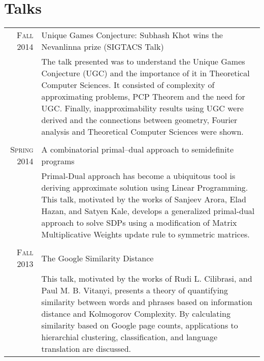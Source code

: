 \documentclass[a4paper,10pt]{article}
\begin{document}
\section{Talks}
\begin{tabular}{r|p{12cm}}
 \textsc{Fall 2014} & Unique Games Conjecture: Subhash Khot wins the Nevanlinna prize (SIGTACS Talk)\\
 &\small{The talk presented was to understand the Unique Games Conjecture (UGC) and the importance of it in Theoretical Computer Sciences. It consisted of complexity of approximating problems, PCP Theorem and the need for UGC. Finally, inapproximability results using UGC were derived and the connections between geometry, Fourier analysis and Theoretical Computer Sciences were shown.}\\
 \multicolumn{2}{c}{} \\
 \textsc{Spring 2014} & A combinatorial primal–dual approach to semidefinite programs\\ 
 &\small{Primal-Dual approach has become a ubiquitous tool is deriving approximate solution using Linear Programming. This talk, motivated by the works of Sanjeev Arora, Elad Hazan, and Satyen Kale, develops a generalized primal-dual approach to solve SDPs using a modification of Matrix Multiplicative Weights update rule to symmetric matrices.}\\
 \multicolumn{2}{c}{} \\
\textsc{Fall 2013} & The Google Similarity Distance\\
&\small{This talk, motivated by the works of Rudi L. Cilibrasi, and Paul M. B. Vitanyi, presents a theory of quantifying similarity between words and phrases based on information distance and Kolmogorov Complexity. By calculating similarity based on Google page counts, applications to hierarchial clustering, classification, and language translation are discussed.}\\
\end{tabular}
\end{document}
